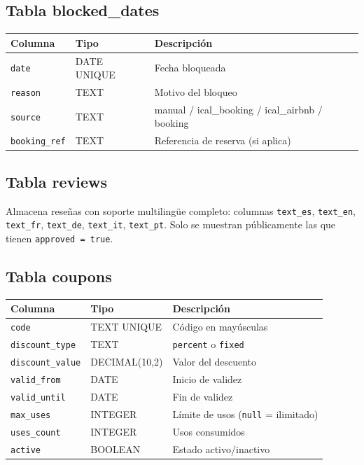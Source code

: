 \documentclass[12pt,a4paper,twoside,openright]{report}
\begin{document}
\subsection{Tabla blocked\_dates}

\begin{longtable}{L{3.5cm} L{3.5cm} L{5.5cm}}
  \toprule
  \textbf{Columna} & \textbf{Tipo} & \textbf{Descripción} \\
  \midrule
  \texttt{date} & DATE UNIQUE & Fecha bloqueada \\
  \texttt{reason} & TEXT & Motivo del bloqueo \\
  \texttt{source} & TEXT & manual / ical\_booking / ical\_airbnb / booking \\
  \texttt{booking\_ref} & TEXT & Referencia de reserva (si aplica) \\
  \bottomrule
\end{longtable}

\subsection{Tabla reviews}

Almacena reseñas con soporte multilingüe completo: columnas
\texttt{text\_es}, \texttt{text\_en}, \texttt{text\_fr}, \texttt{text\_de},
\texttt{text\_it}, \texttt{text\_pt}. Solo se muestran públicamente las que tienen
\texttt{approved = true}.

\subsection{Tabla coupons}

\begin{longtable}{L{3.5cm} L{3.5cm} L{5.5cm}}
  \toprule
  \textbf{Columna} & \textbf{Tipo} & \textbf{Descripción} \\
  \midrule
  \texttt{code} & TEXT UNIQUE & Código en mayúsculas \\
  \texttt{discount\_type} & TEXT & \texttt{percent} o \texttt{fixed} \\
  \texttt{discount\_value} & DECIMAL(10,2) & Valor del descuento \\
  \texttt{valid\_from} & DATE & Inicio de validez \\
  \texttt{valid\_until} & DATE & Fin de validez \\
  \texttt{max\_uses} & INTEGER & Límite de usos (\texttt{null} = ilimitado) \\
  \texttt{uses\_count} & INTEGER & Usos consumidos \\
  \texttt{active} & BOOLEAN & Estado activo/inactivo \\
  \bottomrule
\end{longtable}
\end{document}
